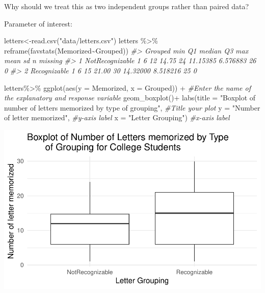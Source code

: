 \documentclass[
]{report}
\newenvironment{Shaded}{\begin{snugshade}}{\end{snugshade}}
\newcommand{\AttributeTok}[1]{\textcolor[rgb]{0.77,0.63,0.00}{#1}}
\newcommand{\CommentTok}[1]{\textcolor[rgb]{0.56,0.35,0.01}{\textit{#1}}}
\newcommand{\FunctionTok}[1]{\textcolor[rgb]{0.00,0.00,0.00}{#1}}
\newcommand{\NormalTok}[1]{#1}
\newcommand{\OtherTok}[1]{\textcolor[rgb]{0.56,0.35,0.01}{#1}}
\newcommand{\SpecialCharTok}[1]{\textcolor[rgb]{0.00,0.00,0.00}{#1}}
\newcommand{\StringTok}[1]{\textcolor[rgb]{0.31,0.60,0.02}{#1}}
\begin{document}
Why should we treat this as two independent groups rather than paired data?

\vspace{0.6in}

Parameter of interest:

\vspace{0.8in}

\begin{Shaded}
\begin{Highlighting}[]
\NormalTok{letters}\OtherTok{\textless{}{-}}\FunctionTok{read.csv}\NormalTok{(}\StringTok{"data/letters.csv"}\NormalTok{)}
\NormalTok{letters }\SpecialCharTok{\%\textgreater{}\%}
    \FunctionTok{reframe}\NormalTok{(}\FunctionTok{favstats}\NormalTok{(Memorized}\SpecialCharTok{\textasciitilde{}}\NormalTok{Grouped))}
\CommentTok{\#\textgreater{}           Grouped min Q1 median    Q3 max     mean       sd  n missing}
\CommentTok{\#\textgreater{} 1 NotRecognizable   1  6     12 14.75  24 11.15385 6.576883 26       0}
\CommentTok{\#\textgreater{} 2    Recognizable   1  6     15 21.00  30 14.32000 8.518216 25       0}
\end{Highlighting}
\end{Shaded}

\begin{Shaded}
\begin{Highlighting}[]
\NormalTok{letters}\SpecialCharTok{\%\textgreater{}\%}
  \FunctionTok{ggplot}\NormalTok{(}\FunctionTok{aes}\NormalTok{(}\AttributeTok{y =}\NormalTok{ Memorized, }\AttributeTok{x =}\NormalTok{ Grouped))  }\SpecialCharTok{+} \CommentTok{\#Enter the name of the explanatory and response variable}
  \FunctionTok{geom\_boxplot}\NormalTok{()}\SpecialCharTok{+}
  \FunctionTok{labs}\NormalTok{(}\AttributeTok{title =} \StringTok{"Boxplot of number of letters memorized by type of grouping"}\NormalTok{, }\CommentTok{\#Title your plot}
       \AttributeTok{y =} \StringTok{"Number of letter memorized"}\NormalTok{, }\CommentTok{\#y{-}axis label}
       \AttributeTok{x =} \StringTok{"Letter Grouping"}\NormalTok{) }\CommentTok{\#x{-}axis label}
\end{Highlighting}
\end{Shaded}

\begin{center}\includegraphics[width=0.7\linewidth]{12-LN012-1ofeach_files/figure-latex/unnamed-chunk-2-1} \end{center}
\end{document}

